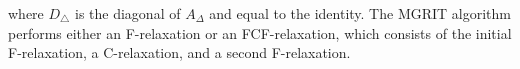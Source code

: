 \documentclass[VANCOUVER,STIX1COL]{WileyNJD-v2}
\begin{document}
%
where $D_\triangle$ is the diagonal of $A_\Delta$ and equal to the identity.
The MGRIT algorithm performs either an F-relaxation or an FCF-relaxation, which consists of the initial F-relaxation, a C-relaxation, and a second F-relaxation.
\end{document}
